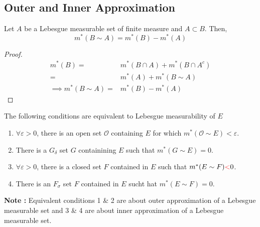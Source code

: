 \subsection{Outer and Inner Approximation}
\begin{definition}
Let $A$ be a Lebesgue measurable set of finite measure and $A \subset B$.
	Then,
\begin{equation}
	m^\ast(B \sim A) = m^\ast(B) - m^\ast(A)
\end{equation}
\begin{proof}
\begin{align*}
	m^\ast(B) = & m^\ast(B \cap A) + m^\ast(B \cap A^c) \\
	= & m^\ast(A) + m^\ast(B \sim A) \\
	\implies m^\ast(B \sim A) = & m^\ast(B) - m^\ast(A)
\end{align*}
\end{proof}
\end{definition}

\begin{theorem}[approximation]
	The following conditions are equivalent to Lebesgue measurability of $E$
\begin{enumerate}
	\item $\forall \varepsilon > 0$, there is an open set $\mathcal{O}$ containing $E$ for which $m^\ast(\mathcal{O}\sim E) < \varepsilon$.
	\item There is a $G_\delta$ set $G$ containining $E$ such that $m^\ast(G \sim E) = 0$.
	\item $\forall \varepsilon > 0$, there is a closed set $F$ contained in $E$ such that $m^\ast(E\sim F) {\color{red}<} 0$.
	\item There is an $F_\sigma$ set $F$ contained in $E$ sucht hat $m^\ast(E \sim F) = 0$.
\end{enumerate}
\end{theorem}

\textbf{Note :} Equivalent conditions 1 \& 2 are about outer approximation of a Lebesgue measurable set and 3 \& 4 are about inner approximation of a Lebesgue measurable set.\\

